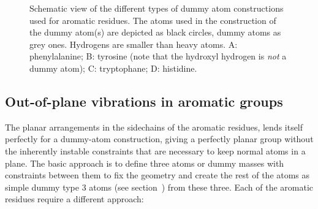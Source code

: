 \begin{figure}
\centerline{}
\caption[Schematic view of the different types of dummy atom
constructions used for aromatic residues.]{Schematic view of the
different types of dummy atom constructions used for aromatic
residues. The atoms used in the construction of the dummy atom(s) are
depicted as black circles, dummy atoms as grey ones. Hydrogens are
smaller than heavy atoms. {\sf A}: phenylalanine; {\sf B}: tyrosine
(note that the hydroxyl hydrogen is {\em not} a dummy atom); {\sf C}:
tryptophane; {\sf D}: histidine.}
\label{fig:dumaro}
\end{figure}

\subsection{Out-of-plane vibrations in aromatic groups}
\label{sec:dummyaro}
The planar arrangements in the sidechains of the aromatic residues,
lends itself perfectly for a dummy-atom construction, giving a
perfectly planar group without the inherently instable constraints
that are necessary to keep normal atoms in a plane. The basic approach
is to define three atoms or dummy masses with constraints between them
to fix the geometry and create the rest of the atoms as simple dummy
type 3 atoms (see section~) from these three. Each of
the aromatic residues require a different approach:


